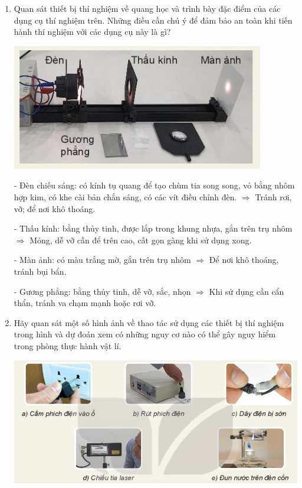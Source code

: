 \begin{enumerate}[label=\bfseries Câu \arabic*:,leftmargin=1.5cm]
{		+ Không trực tiếp thổi tắt ngọn lửa đèn cồn vì sẽ làm ngọn lửa cháy dữ dội hơn. Cách tốt nhất để tắt đèn là đậy nắp đèn cồn lại.
		
	}
	\item {}
	
	
	{
		Quan sát thiết bị thí nghiệm về quang học và trình bày đặc điểm của các dụng cụ thí nghiệm trên. Những điều cần chú ý để đảm bảo an toàn khi tiến hành thí nghiệm với các dụng cụ này là gì?
		
		\begin{center}
			\includegraphics[scale=0.6]{../figs/VN10-2022-PH-TP003-4.jpg}
		\end{center}
	}
	
	\hideall
	{	
		- Đèn chiếu sáng: có kính tụ quang để tạo chùm tia song song, vỏ bằng nhôm hợp kim, có khe cài bản chắn sáng, có các vít điều chỉnh đèn. $\Rightarrow$ Tránh rơi, vỡ; để nơi khô thoáng.
		
		- Thấu kính: bằng thủy tinh, được lắp trong khung nhựa, gắn trên trụ nhôm $\Rightarrow$ Mỏng, dễ vỡ cần để trên cao, cất gọn gàng khi sử dụng xong.
		
		- Màn ảnh: có màu trắng mờ, gắn trên trụ nhôm $\Rightarrow$ Để nơi khô thoáng, tránh bụi bẩn.
		
		- Gương phẳng: bằng thủy tinh, dễ vỡ, sắc, nhọn $\Rightarrow$ Khi sử dụng cần cẩn thẩn, tránh va chạm mạnh hoặc rơi vỡ.
		
	}
	\item {}
	
	
	{
		Hãy quan sát một số hình ảnh về thao tác sử dụng các thiết bị thí nghiệm trong hình và dự đoán xem có những nguy cơ nào có thể gây nguy hiểm trong phòng thực hành vật lí.
		
		\begin{center}
			\includegraphics[scale=0.6]{../figs/VN10-2022-PH-TP003-5.jpg}
		\end{center}
	}
	

\end{enumerate}
